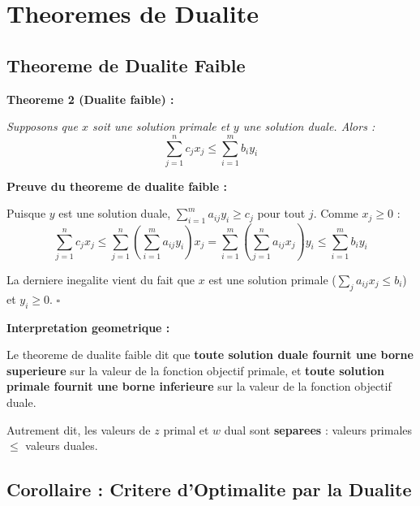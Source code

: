 \documentclass[12pt,a4paper]{article}
\begin{document}
\section{Theoremes de Dualite}

\subsection{Theoreme de Dualite Faible}

\begin{theoreme}
\textbf{Theoreme 2 (Dualite faible) :}

\textit{Supposons que $x$ soit une solution primale et $y$ une solution duale. Alors :}
$$\sum_{j=1}^{n} c_j x_j \leq \sum_{i=1}^{m} b_i y_i$$
\end{theoreme}

\begin{methode}
\textbf{Preuve du theoreme de dualite faible :}

Puisque $y$ est une solution duale, $\sum_{i=1}^m a_{ij} y_i \geq c_j$ pour tout $j$. Comme $x_j \geq 0$ :
$$\sum_{j=1}^n c_j x_j \leq \sum_{j=1}^n \left(\sum_{i=1}^m a_{ij} y_i\right) x_j = \sum_{i=1}^m \left(\sum_{j=1}^n a_{ij} x_j\right) y_i \leq \sum_{i=1}^m b_i y_i$$

La derniere inegalite vient du fait que $x$ est une solution primale ($\sum_j a_{ij} x_j \leq b_i$) et $y_i \geq 0$. $\square$
\end{methode}

\begin{astuce}
\textbf{Interpretation geometrique :}

Le theoreme de dualite faible dit que \textcolor{importantrouge}{\textbf{toute solution duale fournit une borne superieure}} sur la valeur de la fonction objectif primale, et \textcolor{defvert}{\textbf{toute solution primale fournit une borne inferieure}} sur la valeur de la fonction objectif duale.

Autrement dit, les valeurs de $z$ primal et $w$ dual sont \textcolor{titrebleu}{\textbf{separees}} : valeurs primales $\leq$ valeurs duales.
\end{astuce}

\newpage
\subsection{Corollaire : Critere d'Optimalite par la Dualite}
\end{document}

